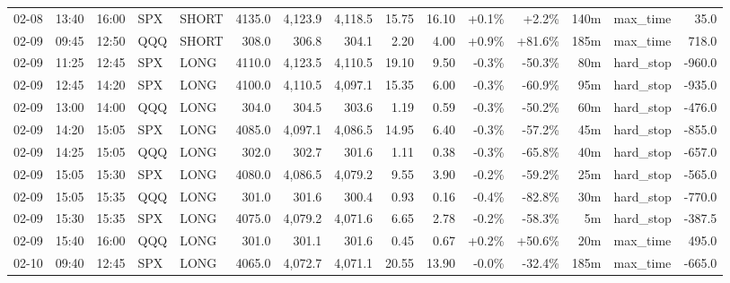 \documentclass[11pt,a4paper,twoside]{article}
\begin{document}
\begin{landscape}
\begin{center}
\begin{longtable}{>{\color{txtmain}}l l l l l r r r r r r r r >{\color{txtmain}}l r}
02-08 & 13:40 & 16:00 & SPX & SHORT & 4135.0 & 4,123.9 & 4,118.5 & 15.75 & 16.10 & \textcolor{wingreen}{+0.1\%} & \textcolor{wingreen}{+2.2\%} & 140m & max\_time & \textcolor{wingreen}{35.0} \\
02-09 & 09:45 & 12:50 & QQQ & SHORT & 308.0 & 306.8 & 304.1 & 2.20 & 4.00 & \textcolor{wingreen}{+0.9\%} & \textcolor{wingreen}{+81.6\%} & 185m & max\_time & \textcolor{wingreen}{718.0} \\
02-09 & 11:25 & 12:45 & SPX & LONG & 4110.0 & 4,123.5 & 4,110.5 & 19.10 & 9.50 & \textcolor{lossred}{-0.3\%} & \textcolor{lossred}{-50.3\%} & 80m & hard\_stop & \textcolor{lossred}{-960.0} \\
02-09 & 12:45 & 14:20 & SPX & LONG & 4100.0 & 4,110.5 & 4,097.1 & 15.35 & 6.00 & \textcolor{lossred}{-0.3\%} & \textcolor{lossred}{-60.9\%} & 95m & hard\_stop & \textcolor{lossred}{-935.0} \\
02-09 & 13:00 & 14:00 & QQQ & LONG & 304.0 & 304.5 & 303.6 & 1.19 & 0.59 & \textcolor{lossred}{-0.3\%} & \textcolor{lossred}{-50.2\%} & 60m & hard\_stop & \textcolor{lossred}{-476.0} \\
02-09 & 14:20 & 15:05 & SPX & LONG & 4085.0 & 4,097.1 & 4,086.5 & 14.95 & 6.40 & \textcolor{lossred}{-0.3\%} & \textcolor{lossred}{-57.2\%} & 45m & hard\_stop & \textcolor{lossred}{-855.0} \\
02-09 & 14:25 & 15:05 & QQQ & LONG & 302.0 & 302.7 & 301.6 & 1.11 & 0.38 & \textcolor{lossred}{-0.3\%} & \textcolor{lossred}{-65.8\%} & 40m & hard\_stop & \textcolor{lossred}{-657.0} \\
02-09 & 15:05 & 15:30 & SPX & LONG & 4080.0 & 4,086.5 & 4,079.2 & 9.55 & 3.90 & \textcolor{lossred}{-0.2\%} & \textcolor{lossred}{-59.2\%} & 25m & hard\_stop & \textcolor{lossred}{-565.0} \\
02-09 & 15:05 & 15:35 & QQQ & LONG & 301.0 & 301.6 & 300.4 & 0.93 & 0.16 & \textcolor{lossred}{-0.4\%} & \textcolor{lossred}{-82.8\%} & 30m & hard\_stop & \textcolor{lossred}{-770.0} \\
02-09 & 15:30 & 15:35 & SPX & LONG & 4075.0 & 4,079.2 & 4,071.6 & 6.65 & 2.78 & \textcolor{lossred}{-0.2\%} & \textcolor{lossred}{-58.3\%} & 5m & hard\_stop & \textcolor{lossred}{-387.5} \\
02-09 & 15:40 & 16:00 & QQQ & LONG & 301.0 & 301.1 & 301.6 & 0.45 & 0.67 & \textcolor{wingreen}{+0.2\%} & \textcolor{wingreen}{+50.6\%} & 20m & max\_time & \textcolor{wingreen}{495.0} \\
02-10 & 09:40 & 12:45 & SPX & LONG & 4065.0 & 4,072.7 & 4,071.1 & 20.55 & 13.90 & \textcolor{lossred}{-0.0\%} & \textcolor{lossred}{-32.4\%} & 185m & max\_time & \textcolor{lossred}{-665.0} \\

\end{longtable}
\end{center}
\end{landscape}
\end{document}
